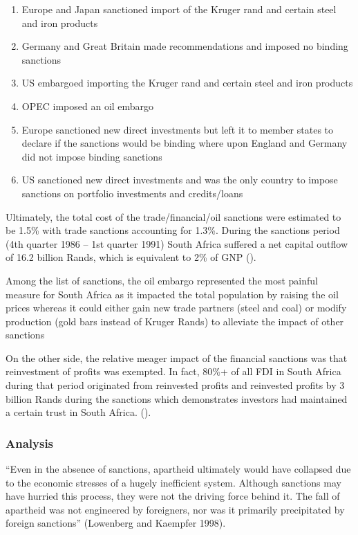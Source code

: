 \documentclass{elsarticle}
\begin{document}
\begin{enumerate}
    \item Europe and Japan sanctioned import of the Kruger rand and certain steel and iron products
    \item Germany and Great Britain made recommendations and imposed no binding sanctions
    \item US embargoed importing the Kruger rand and certain steel and iron products
    \item OPEC imposed an oil embargo
    \item Europe sanctioned new direct investments but left it to member states to declare if the sanctions would be binding where upon England and Germany did not impose binding sanctions
    \item US sanctioned new direct investments and was the only country to impose sanctions on portfolio investments and credits/loans
\end{enumerate}

Ultimately, the total cost of the trade/financial/oil sanctions were estimated to be 1.5\% with trade sanctions accounting for 1.3\%. During the sanctions period (4th quarter 1986 – 1st quarter 1991) South Africa suffered a net capital outflow of 16.2 billion Rands, which is equivalent to 2\% of GNP (\cite{Hefti2013}). 

Among the list of sanctions, the oil embargo represented the most painful measure for South Africa as it impacted the total population by raising the oil prices whereas it could either gain new trade partners (steel and coal) or modify production (gold bars instead of Kruger Rands) to alleviate the impact of other sanctions

On the other side, the relative meager impact of the financial sanctions was that reinvestment of profits was exempted. In fact, 80\%+ of all FDI in South Africa during that period originated from reinvested profits and reinvested profits by 3 billion Rands during the sanctions which demonstrates investors had maintained a certain trust in South Africa. (\cite{Hefti2013}).

\subsubsection{Analysis}
``Even in the absence of sanctions, apartheid ultimately would have collapsed due to the economic stresses of a hugely inefficient system. Although sanctions may have hurried this process, they were not the driving force behind it. The fall of apartheid was not engineered by foreigners, nor was it primarily precipitated by foreign sanctions'' (Lowenberg and Kaempfer 1998). 
\end{document}
